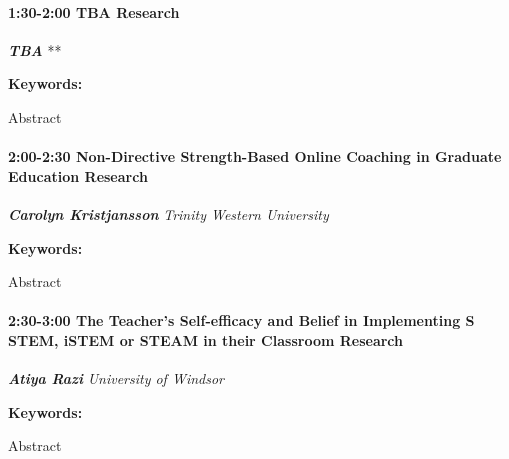 \documentclass[
]{book}
\begin{document}
\begin{session}
\hypertarget{tba-research}{%
\paragraph*{\texorpdfstring{1:30-2:00 \textbar{} \textbf{TBA} \textbar{}
Research}{1:30-2:00 \textbar{} TBA \textbar{} Research}}\label{tba-research}}

\textbf{\emph{TBA}} \textbar{} **

\textbf{Keywords:}

Abstract
\end{session}

\begin{session}
\hypertarget{non-directive-strength-based-online-coaching-in-graduate-education-research}{%
\paragraph*{\texorpdfstring{2:00-2:30 \textbar{} \textbf{Non-Directive
Strength-Based Online Coaching in Graduate Education} \textbar{}
Research}{2:00-2:30 \textbar{} Non-Directive Strength-Based Online Coaching in Graduate Education \textbar{} Research}}\label{non-directive-strength-based-online-coaching-in-graduate-education-research}}

\textbf{\emph{Carolyn Kristjansson}} \textbar{} \emph{Trinity Western
University}

\textbf{Keywords:}

Abstract
\end{session}

\begin{session}
\hypertarget{the-teachers-self-efficacy-and-belief-in-implementing-s-stem-istem-or-steam-in-their-classroom-research}{%
\paragraph*{\texorpdfstring{2:30-3:00 \textbar{} \textbf{The Teacher's
Self-efficacy and Belief in Implementing S STEM, iSTEM or STEAM in their
Classroom} \textbar{}
Research}{2:30-3:00 \textbar{} The Teacher's Self-efficacy and Belief in Implementing S STEM, iSTEM or STEAM in their Classroom \textbar{} Research}}\label{the-teachers-self-efficacy-and-belief-in-implementing-s-stem-istem-or-steam-in-their-classroom-research}}

\textbf{\emph{Atiya Razi}} \textbar{} \emph{University of Windsor}

\textbf{Keywords:}

Abstract
\end{session}
\end{document}
